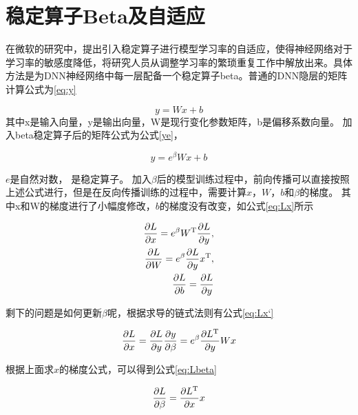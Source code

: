 \section{稳定算子Beta及自适应}   
在微软的研究中，提出引入稳定算子进行模型学习率的自适应，使得神经网络对于学习率的敏感度降低，将研究人员从调整学习率的繁琐重复工作中解放出来。具体方法是为DNN神经网络中每一层配备一个稳定算子beta。普通的DNN隐层的矩阵计算公式为\ref{eq:y}

\begin{equation}
	\label{eq:y}
   	y = Wx + b
\end{equation} 	 
其中x是输入向量，y是输出向量，W是现行变化参数矩阵，b是偏移系数向量。
加入beta稳定算子后的矩阵公式为公式\ref{ye}，

\begin{equation}
	\label{eq:ye}
   	y = {e^\beta }Wx + b
\end{equation} 

$e$是自然对数， 是稳定算子。
加入$\beta$后的模型训练过程中，前向传播可以直接按照上述公式进行，但是在反向传播训练的过程中，需要计算$x$，$W$，$b$和$\beta$的梯度。
其中x和W的梯度进行了小幅度修改，$b$的梯度没有改变，如公式\ref{eq:Lx}所示

\begin{equation}
	\label{eq:Lx}
   	\begin{split}
\frac{{\partial L}}{{\partial x}} = {e^\beta }{W^{\rm T}}\frac{{\partial L}}{{\partial y}},\\
\frac{{\partial L}}{{\partial W}} = {e^\beta }\frac{{\partial L}}{{\partial y}}{x^{\rm T}},\\
\frac{{\partial L}}{{\partial b}} = \frac{{\partial L}}{{\partial y}}
\end{split}
\end{equation} 	 

剩下的问题是如何更新$\beta$呢，根据求导的链式法则有公式\ref{eq:Lx‘}

\begin{equation}
	\label{eq:Lx‘}
   	\frac{{\partial L}}{{\partial x}} = \frac{{\partial L}}{{\partial y}}\frac{{\partial y}}{{\partial \beta }} = {e^\beta }\frac{{\partial {L^{\rm T}}}}{{\partial y}}Wx
\end{equation} 

根据上面求$x$的梯度公式，可以得到公式\ref{eq:Lbeta}

\begin{equation}
	\label{eq:Lbeta}
   	\frac{{\partial L}}{{\partial \beta }} = \frac{{\partial {L^{\rm T}}}}{{\partial x}}x
\end{equation}

